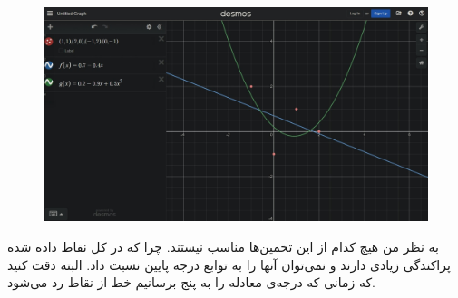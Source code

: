 \begin{figure}[H]
    \centerline{\includegraphics[scale=0.275]{pics/2-3.jpeg}}
\end{figure}
\noindent
به نظر من هیچ کدام از این تخمین‌ها مناسب نیستند. چرا که در کل نقاط داده شده پراکندگی زیادی دارند و نمی‌توان
آنها را به توابع درجه پایین نسبت داد. البته دقت کنید که زمانی که درجه‌ی معادله را به پنج برسانیم
خط از نقاط رد می‌شود.





